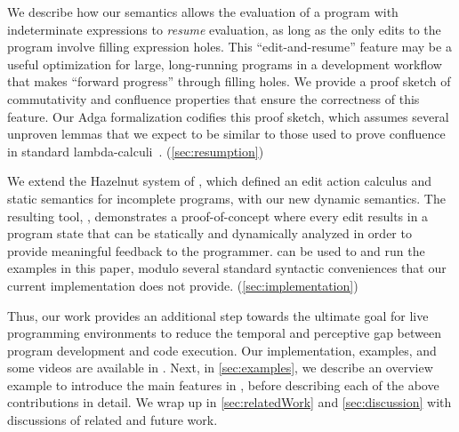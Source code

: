 %
%
We describe how our semantics allows the evaluation of a program with
indeterminate expressions to \emph{resume} evaluation, as long as the only edits
to the program involve filling expression holes.
%
This ``edit-and-resume'' feature may be a useful optimization for large,
long-running programs in a development workflow that makes ``forward progress''
through filling holes.
%
We provide a proof sketch of commutativity and confluence properties that ensure
the correctness of this feature.
%
Our Adga formalization codifies this proof sketch, which assumes several
unproven lemmas that we expect to be similar to those used to prove confluence
in standard lambda-calculi~\cite{XXX}.
%
(\autoref{sec:resumption})

%
%
We extend the Hazelnut system of \citet{popl-paper}, which defined an edit
action calculus and static semantics for incomplete programs, with our new
dynamic semantics.
%
The resulting tool, \HazelnutLive{}, demonstrates a proof-of-concept where every
edit results in a program state that can be statically and dynamically analyzed
in order to provide meaningful feedback to the programmer.
%
\HazelnutLive{} can be used to and run the examples in this paper, modulo
several standard syntactic conveniences that our current implementation does not
provide.
%
(\autoref{sec:implementation})


\vspace{5pt}

Thus, our work provides an additional step towards the ultimate goal for live
programming environments to reduce the temporal and perceptive gap between
program development and code execution.
%
Our implementation, examples, and some videos are available in \suppMaterials{}.
%
Next, in \autoref{sec:examples}, we describe an overview example to introduce
the main features in \HazelnutLive{}, before describing each of the above
contributions in detail.
%
We wrap up in \autoref{sec:relatedWork} and \autoref{sec:discussion} with
discussions of related and future work.


